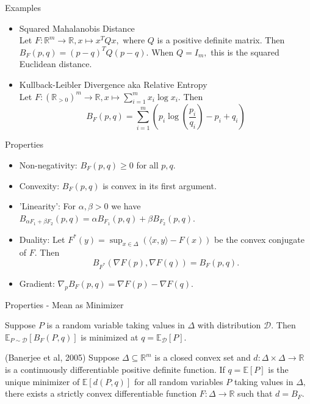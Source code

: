 \documentclass[10pt]{beamer}
\begin{document}
\begin{frame}{Examples}
\begin{itemize}
 \item Squared Mahalanobis Distance
 \\
 Let $F:\mathbb{R}^m \to \mathbb{R}, x \mapsto x^TQx,$ where $Q$ is a positive definite matrix. Then $B_F(p,q) = (p-q)^T Q (p-q).$ When $Q = I_m,$ this is the squared Euclidean distance.
 
 \item Kullback-Leibler Divergence aka Relative Entropy 
 \\
 Let $F:(\mathbb{R}_{>0})^m \to \mathbb{R}, x \mapsto \sum_{i=1}^m x_i \log x_i.$ Then $$B_F(p,q) = \sum_{i=1}^m  \left( p_i \log\left(\frac{p_i}{q_i}\right) -p_i + q_i\right)$$ 
\end{itemize}

\end{frame}

\begin{frame}{Properties}
 \begin{itemize}
  \item Non-negativity: $B_F(p,q)\geq 0$ for all $p,q.$
  \item Convexity: $B_F(p,q)$ is convex in its first argument.
  \item 'Linearity': For $\alpha, \beta>0$ we have $B_{\alpha F_1 + \beta F_2}(p,q) = \alpha B_{F_1}(p,q) + \beta B_{F_2}(p,q).$
  \item Duality: Let $F^*(y) = \sup_{x\in \Delta} ( \langle x, y \rangle - F(x) )$ be the convex conjugate of $F.$ Then $$ B_{F^*}(\nabla F(p), \nabla F(q)) = B_F(p,q).$$
  \item Gradient: $\nabla_p B_F(p,q) = \nabla F(p) - \nabla F(q).$
  
 \end{itemize}

\end{frame}

\begin{frame}{Properties - Mean as Minimizer}
 \begin{Theorem}
  Suppose $P$ is a random variable taking values in $\Delta$ with distribution $\mathcal{D}.$ Then $\mathbb{E}_{P \sim \mathcal{D}}[ B_F(P,q)]$ is minimized at $q = \mathbb{E}_{\mathcal{D}}[P].$
 \end{Theorem}

 \begin{Theorem}(Banerjee et al, 2005)
  Suppose $\Delta\subseteq \mathbb{R}^m $ is a closed convex set and $d: \Delta \times \Delta \to \mathbb{R}$ is a continuously differentiable positive definite function. If $q=\mathbb{E}[P]$ is the unique minimizer of $\mathbb{E}[d(P,q)]$ for all random variables $P$ taking values in $\Delta,$ there exists a strictly convex differentiable function $F:\Delta\to\mathbb{R}$ such that $d = B_F.$
 \end{Theorem}
\end{frame}
\end{document}
